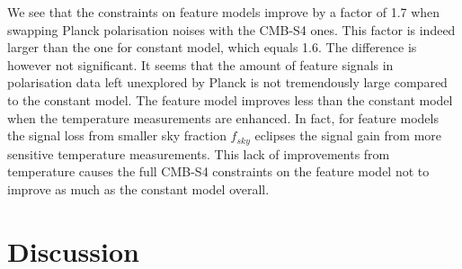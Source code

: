
We see that the constraints on feature models improve by a factor of 1.7 when swapping Planck polarisation noises with the CMB-S4 ones. This factor is indeed larger than the one for constant model, which equals 1.6. The difference is however not significant. It seems that the amount of feature signals in polarisation data left unexplored by Planck is not tremendously large compared to the constant model. The feature model improves less than the constant model when the temperature measurements are enhanced. In fact, for feature models the signal loss from smaller sky fraction $f_{sky}$ eclipses the signal gain from more sensitive temperature measurements. This lack of improvements from temperature causes the full CMB-S4 constraints on the feature model not to improve as much as the constant model overall.


\section{Discussion} \label{section: conclusion}

